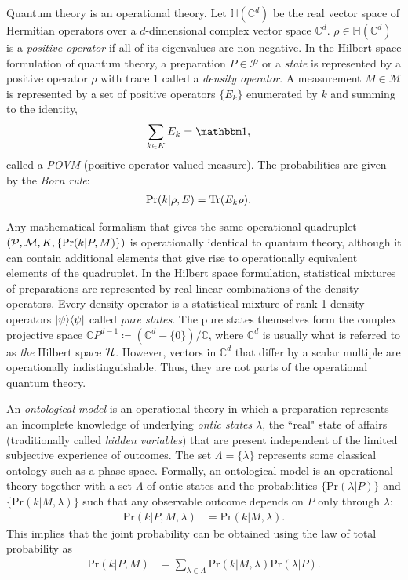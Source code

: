 Quantum theory is an operational theory. Let $\mathbb{H}(\mathbb{C}^d)$ be the real vector space of Hermitian operators over a $d$-dimensional complex vector space $\mathbb{C}^d$. $\rho \in \mathbb{H}(\mathbb{C}^d)$ is a \emph{positive operator} if all of its eigenvalues are non-negative. In the Hilbert space formulation of quantum theory, a preparation $P \in \mathcal{P}$ or a \emph{state} is represented by a positive operator $\rho$ with trace 1 called a \emph{density operator}. A measurement $M \in \mathcal{M}$ is represented by a set of positive operators $\{E_k\}$ enumerated by $k$ and summing to the identity,
\begin{align}
\sum_{k \in K} E_k &= \id,
\end{align}
called a \emph{POVM} (positive-operator valued measure).
The probabilities are given by the \emph{Born rule}:
\begin{align}
\text{Pr} (k|\rho,E) &= \mathrm{Tr} (E_k \rho).
\end{align}

Any mathematical formalism that gives the same operational quadruplet $(\mathcal{P}, \mathcal{M},\\K,\{\text{Pr}(k|P,M)\})$ is operationally identical to quantum theory, although it can contain additional elements that give rise to operationally equivalent elements of the quadruplet. In the Hilbert space formulation, statistical mixtures of preparations are represented by real linear combinations of the density operators. Every density operator is a statistical mixture of rank-1 density operators ${\left\vert{\psi}\right\rangle}{\left\langle{\psi}\right\vert}$ called \emph{pure states}. The pure states themselves form the complex projective space $\mathbb{C}P^{d-1} \coloneqq (\mathbb{C}^d - \{0\} )/\mathbb{C}$, where $\mathbb{C}^d$ is usually what is referred to as \emph{the} Hilbert space $\mathcal{H}$. However, vectors in $\mathbb{C}^d$ that differ by a scalar multiple are operationally indistinguishable. Thus, they are not parts of the operational quantum theory.

An \emph{ontological model} is an operational theory in which a preparation represents an incomplete knowledge of underlying \emph{ontic states} $\lambda$, the ``real" state of affairs (traditionally called \emph{hidden variables}) that are present independent of the limited subjective experience of outcomes. The set $\Lambda = \{\lambda\}$ represents some classical ontology such as a phase space. Formally, an ontological model is an operational theory together with a set $\Lambda$ of ontic states and the probabilities $\{\text{Pr}(\lambda|P)\}$ and $\{\text{Pr}(k|M,\lambda)\}$ such that any observable outcome depends on $P$ only through $\lambda$:
\begin{align}
\text{Pr}(k|P,M,\lambda) &= \text{Pr}(k|M,\lambda).
\end{align}
This implies that the joint probability can be obtained using the law of total probability as
\begin{align}\label{total-probability}
	\text{Pr}(k|P,M) &= \sum_{\lambda \in \Lambda} \text{Pr}(k|M,\lambda) \text{Pr}(\lambda|P).
\end{align}


